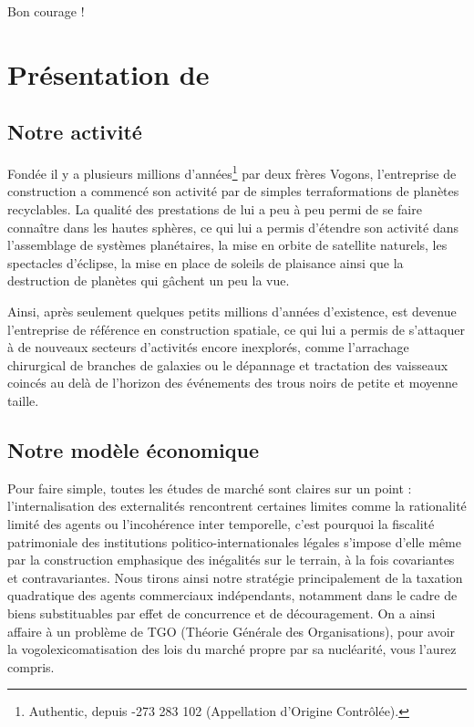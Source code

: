 Bon courage !

\newpage

\section{Présentation de \provogon{}}

\subsection{Notre activité}

Fondée il y a plusieurs millions d'années\footnote{\provogon{} Authentic,
depuis -273 283 102 (Appellation d'Origine Contrôlée).} par deux frères Vogons,
l'entreprise de construction \provogon{} a commencé son activité par de simples
terraformations de planètes recyclables.  La qualité des prestations de
\provogon{} lui a peu à peu permi de se faire connaître dans les hautes
sphères, ce qui lui a permis d'étendre son activité dans l'assemblage de
systèmes planétaires, la mise en orbite de satellite naturels, les spectacles
d'éclipse, la mise en place de soleils de plaisance ainsi que la destruction de
planètes qui gâchent un peu la vue.

Ainsi, après seulement quelques petits millions d'années d'existence, \provogon{}
est devenue l'entreprise de référence en construction spatiale, ce qui lui a
permis de s'attaquer à de nouveaux secteurs d'activités encore inexplorés,
comme l'arrachage chirurgical de branches de galaxies ou le dépannage et
tractation des vaisseaux coincés au delà de l'horizon des événements des trous
noirs de petite et moyenne taille.

\subsection{Notre modèle économique}

Pour faire simple, toutes les études de marché sont claires sur un point :
l'internalisation des externalités rencontrent certaines limites comme la
rationalité limité des agents ou l'incohérence inter temporelle, c'est pourquoi
la fiscalité patrimoniale des institutions politico-internationales légales
s'impose d'elle même par la construction emphasique des inégalités sur le
terrain, à la fois covariantes et contravariantes. Nous tirons ainsi notre
stratégie principalement de la taxation quadratique des agents commerciaux
indépendants, notamment dans le cadre de biens substituables par effet de
concurrence et de découragement. On a ainsi affaire à un problème de TGO
(Théorie Générale des Organisations), pour avoir la vogolexicomatisation des
lois du marché propre par sa nucléarité, vous l'aurez compris.

